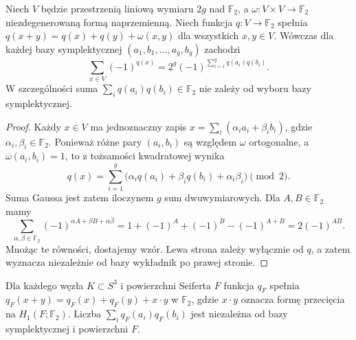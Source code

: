 \begin{lemat}
\label{lem:tg-arf-gauss}
Niech $V$ będzie przestrzenią liniową wymiaru $2g$ nad
$\mathbb F_2$, a $\omega\colon V\times V\to\mathbb F_2$
niezdegenerowaną formą naprzemienną. Niech funkcja
$q\colon V\to\mathbb F_2$ spełnia
$q(x+y)=q(x)+q(y)+\omega(x,y)$ dla wszystkich $x,y\in V$.
Wówczas dla każdej bazy symplektycznej
$(a_1,b_1,\ldots,a_g,b_g)$ zachodzi
\[
\sum_{x\in V}(-1)^{q(x)}
=2^g(-1)^{\sum_{i=1}^g q(a_i)q(b_i)}.
\]
W szczególności suma $\sum_iq(a_i)q(b_i)\in\mathbb F_2$
nie zależy od wyboru bazy symplektycznej.
\end{lemat}

\begin{proof}
Każdy $x\in V$ ma jednoznaczny zapis
$x=\sum_i(\alpha_i a_i+\beta_i b_i)$, gdzie
$\alpha_i,\beta_i\in\mathbb F_2$. Ponieważ różne pary
$(a_i,b_i)$ są względem $\omega$ ortogonalne, a
$\omega(a_i,b_i)=1$, to z tożsamości kwadratowej wynika
\[
q(x)=\sum_{i=1}^g
\bigl(\alpha_i q(a_i)+\beta_i q(b_i)+\alpha_i\beta_i\bigr)
\pmod 2.
\]
Suma Gaussa jest zatem iloczynem $g$ sum dwuwymiarowych.
Dla $A,B\in\mathbb F_2$ mamy
\[
\sum_{\alpha,\beta\in\mathbb F_2}
(-1)^{\alpha A+\beta B+\alpha\beta}
=1+(-1)^A+(-1)^B-(-1)^{A+B}
=2(-1)^{AB}.
\]
Mnożąc te równości, dostajemy wzór. Lewa strona zależy
wyłącznie od $q$, a zatem wyznacza niezależnie od bazy
wykładnik po prawej stronie.
\end{proof}

\begin{stwierdzenie}
Dla każdego węzła $K\subset S^3$ i powierzchni Seiferta
$F$ funkcja $q_F$ spełnia
$q_F(x+y)=q_F(x)+q_F(y)+x\cdot y$ w $\mathbb F_2$,
gdzie $x\cdot y$ oznacza formę przecięcia na $H_1(F;\mathbb F_2)$.
Liczba $\sum_iq_F(a_i)q_F(b_i)$ jest niezależna od bazy
symplektycznej i powierzchni $F$.
\end{stwierdzenie}

